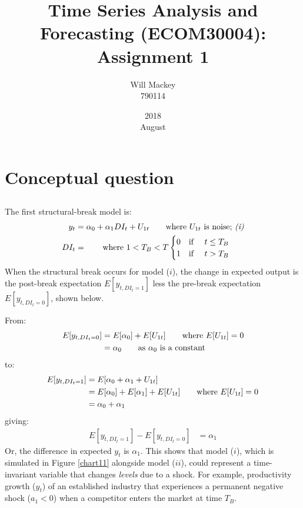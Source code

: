 \documentclass{article}\usepackage[]{graphicx}\usepackage[]{color}
\title{Time Series Analysis and Forecasting (ECOM30004): Assignment 1}
\date{2018\\ August}
\author{Will Mackey\\ 790114}
\begin{document}
\maketitle





\section{Conceptual question}

\subsection{} %
    The first structural-break model is:
        \begin{align*}
          y_t  &= \alpha_0 + \alpha_1 DI_{t} + U_{1t}    \tag*{where $U_{1t}$ is noise; \textit{(i)}} \\
          DI_t &=                                      \tag*{where $1< T_B <T$}
          \begin{cases}
            0 \text{\quad  if \quad} t \leq T_B \\
            1 \text{\quad  if \quad} t >    T_B
          \end{cases}
        \end{align*}
    When the structural break occurs for model ($i$), the change in expected output is the post-break expectation $E[y_{t,DI_{t}=1}]$ less the pre-break expectation $E[y_{t,DI_{t}=0}]$, shown below.

    From:
        \begin{align*}
          E[y_{t,DI_{t}=0}] &= E[\alpha_0] + E[U_{1t}]    \tag*{where $E[U_{1t}]=0$} \\ 
                      &= \alpha_0                         \tag*{as $\alpha_0$ is a constant}
        \end{align*}
    to:
        \begin{align*}
          E[y_{t,DI_{t}=1}] &= E[\alpha_0 + \alpha_1 + U_{1t}]                                 \\ 
                            &= E[\alpha_0] + E[\alpha_1]   + E[U_{1t}]    \tag*{where $E[U_{1t}]=0$} \\ 
                            &= \alpha_0  + \alpha_1
        \end{align*}
    giving:
        \begin{align*}
          E[y_{t,DI_{t}=1}] - E[y_{t,DI_{t}=0}] &= \alpha_1
        \end{align*}
    Or, the difference in expected $y_t$ is $\alpha_1$. This shows that model ($i$), which is simulated in Figure \ref{chart11} alongside model ($ii$), could represent a time-invariant variable that changes \textit{levels} due to a shock. For example, productivity growth ($y_t$) of an established industry that experiences a permanent negative shock ($a_1<0$) when a competitor enters the market at time $T_B$.
\end{document}
